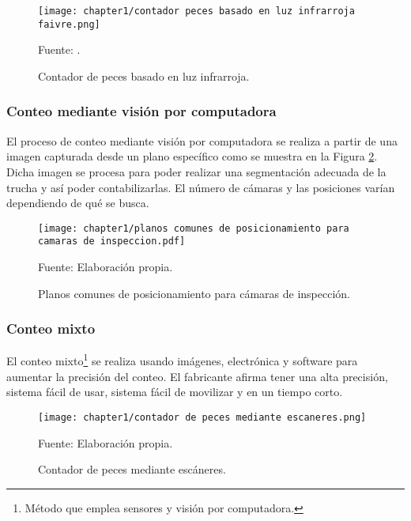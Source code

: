 \begin{figure}[H]
	\centering
	\texttt{[image: chapter1/contador peces basado en luz infrarroja faivre.png]}
	\caption{Contador de peces basado en luz infrarroja.}
	Fuente: \cite{FAIVRE2013}.
	\label{fig:contador peces basado en luz infrarroja faivre}
\end{figure}

\subsubsection{Conteo mediante visión por computadora}

El proceso de conteo mediante visión por computadora se realiza a partir de una imagen capturada desde un plano específico como se muestra en la  Figura \ref{fig:planos comunes de posicionamiento para camaras de inspeccion}. Dicha imagen se procesa para poder realizar una segmentación adecuada de la trucha y así poder contabilizarlas. El número de cámaras y las posiciones varían dependiendo de qué se busca.

\begin{figure}[H]
	\centering
	\texttt{[image: chapter1/planos comunes de posicionamiento para camaras de inspeccion.pdf]}
	\caption{Planos comunes de posicionamiento para cámaras de inspección.}
	Fuente: Elaboración propia.
	\label{fig:planos comunes de posicionamiento para camaras de inspeccion}
\end{figure}

\subsubsection{Conteo mixto}

El conteo mixto\footnote{Método que emplea sensores y visión por computadora.} se realiza usando imágenes, electrónica y software para aumentar la precisión del conteo. El fabricante afirma tener una alta precisión, sistema fácil de usar, sistema fácil de movilizar y en un tiempo corto. \cite{AquaScan2015}

\begin{figure}[H]
	\centering
	\texttt{[image: chapter1/contador de peces mediante escaneres.png]}
	\caption{Contador de peces mediante escáneres.}
	Fuente: Elaboración propia.
	\label{fig:contador de peces mediante escaneres}
\end{figure}

